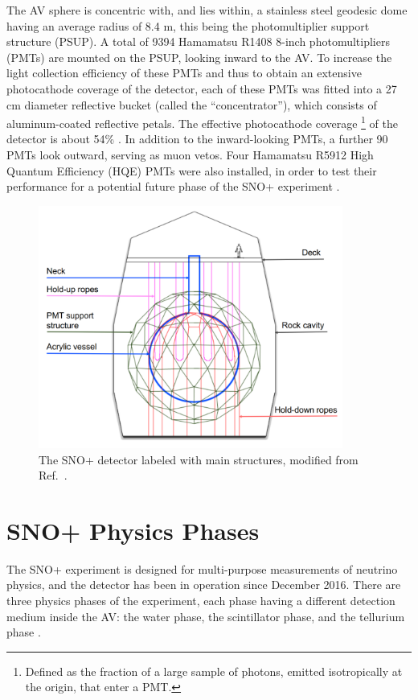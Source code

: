 The AV sphere is concentric with, and lies within, a stainless steel geodesic dome having an average radius of 8.4 m, this being the photomultiplier support structure (PSUP). A total of 9394 Hamamatsu R1408 8-inch photomultipliers (PMTs) are mounted on the PSUP, looking inward to the AV. To increase the light collection efficiency of these PMTs and thus to obtain an extensive photocathode coverage of the detector, each of these PMTs was fitted into a 27 cm diameter reflective bucket (called the ``concentrator''), which consists of aluminum-coated reflective petals. The effective photocathode coverage \footnote{Defined as the fraction of a large sample of photons, emitted isotropically at the origin, that enter a PMT.} of the detector is about 54\% \cite{whitepaper}. In addition to the inward-looking PMTs, a further 90 PMTs look outward, serving as muon vetos. Four Hamamatsu R5912 High Quantum Efficiency (HQE) PMTs were also installed, in order to test their performance for a potential future phase of the SNO+ experiment \cite{stringer2019sensitivity}.

\begin{figure}[htbp]
	\centering
	\includegraphics[width=10cm]{SNOPdetector.png}
	\caption[The SNO+ detector labeled with main structures.]{The SNO+ detector labeled with main structures, modified from Ref.~\cite{jones2011background}.}
	\label{snopdetector}
\end{figure}

\section{SNO+ Physics Phases}\label{sect:physicsPhase}

The SNO+ experiment is designed for multi-purpose measurements of neutrino physics, and the detector has been in operation since December 2016. There are three physics phases of the experiment, each phase having a different detection medium inside the AV: the water phase, the scintillator phase, and the tellurium phase \cite{whitepaper}. 

